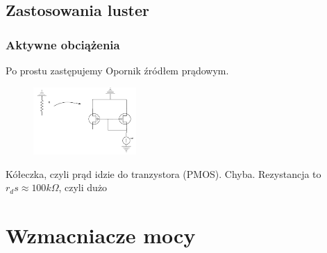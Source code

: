 \documentclass[10pt,a4paper]{article}
\begin{document}
\subsection{Zastosowania luster}
\subsubsection{Aktywne obciążenia}
Po prostu zastępujemy Opornik źródłem prądowym.
\begin{figure}[H]
\centering
\includegraphics[width=0.35\textwidth]{lustroZast}
\end{figure}
Kółeczka, czyli prąd idzie do tranzystora (PMOS). Chyba. Rezystancja to $r_ds \approx 100k \Omega$, czyli dużo 

\section{Wzmacniacze mocy}
\end{document}
